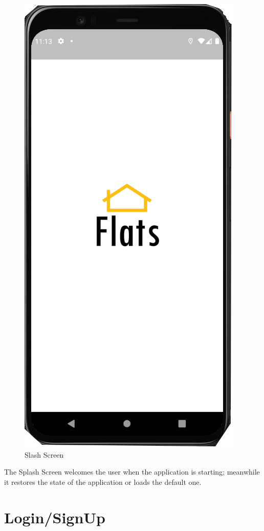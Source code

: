 \begin{figure}[H]
    \centering
    \includegraphics[scale = 0.4]{images/splash.png}
    \caption{Slash Screen}
\end{figure}
The Splash Screen welcomes the user when the application is starting; meanwhile it restores the state of the application or loads the default one.\\

\section{Login/SignUp}

